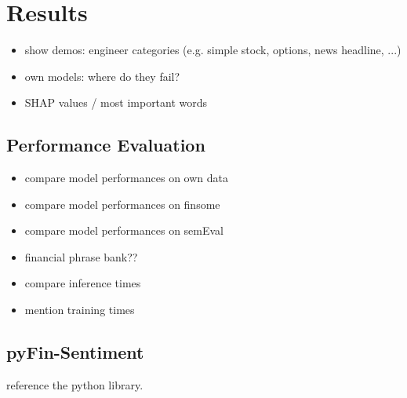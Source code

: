 \section{Results}


\begin{itemize}[noitemsep]
	\item show demos: engineer categories (e.g. simple stock, options, news headline, ...) 
	\item own models: where do they fail?
	\item SHAP values / most important words
\end{itemize}



\subsection{Performance Evaluation}

\begin{itemize}[noitemsep]
	\item compare model performances on own data
	\item compare model performances on finsome
	\item compare model performances on semEval
	\item financial phrase bank??
	\item compare inference times
	\item mention training times
\end{itemize}




\subsection{pyFin-Sentiment}
reference the python library.